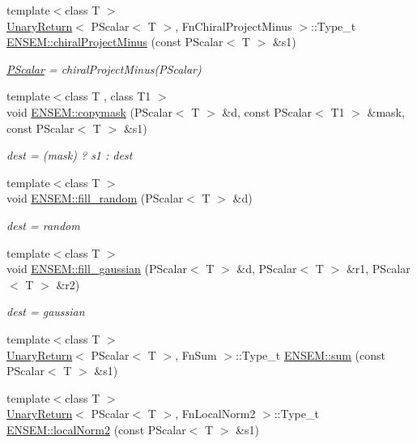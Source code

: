 \begin{DoxyCompactItemize}
{\footnotesize template$<$class T $>$ }\\\mbox{\hyperlink{structUnaryReturn}{Unary\+Return}}$<$ P\+Scalar$<$ T $>$, Fn\+Chiral\+Project\+Minus $>$\+::Type\+\_\+t \mbox{\hyperlink{group__primscalar_ga145e49e169b22a3ded82ba8af1b15da2}{E\+N\+S\+E\+M\+::chiral\+Project\+Minus}} (const P\+Scalar$<$ T $>$ \&s1)
\begin{DoxyCompactList}\small\item\em \mbox{\hyperlink{classENSEM_1_1PScalar}{P\+Scalar}} = chiral\+Project\+Minus(\+P\+Scalar) \end{DoxyCompactList}\item 
{\footnotesize template$<$class T , class T1 $>$ }\\void \mbox{\hyperlink{group__primscalar_gae14d6fea866a875601cb8d100fc8b3c2}{E\+N\+S\+E\+M\+::copymask}} (P\+Scalar$<$ T $>$ \&d, const P\+Scalar$<$ T1 $>$ \&mask, const P\+Scalar$<$ T $>$ \&s1)
\begin{DoxyCompactList}\small\item\em dest = (mask) ? s1 \+: dest \end{DoxyCompactList}\item 
{\footnotesize template$<$class T $>$ }\\void \mbox{\hyperlink{group__primscalar_ga7524cfb0562281bfab7fb3eca1daba0d}{E\+N\+S\+E\+M\+::fill\+\_\+random}} (P\+Scalar$<$ T $>$ \&d)
\begin{DoxyCompactList}\small\item\em dest = random \end{DoxyCompactList}\item 
{\footnotesize template$<$class T $>$ }\\void \mbox{\hyperlink{group__primscalar_gaec5e0050ee9c339ede0d4b1a839cea7b}{E\+N\+S\+E\+M\+::fill\+\_\+gaussian}} (P\+Scalar$<$ T $>$ \&d, P\+Scalar$<$ T $>$ \&r1, P\+Scalar$<$ T $>$ \&r2)
\begin{DoxyCompactList}\small\item\em dest = gaussian \end{DoxyCompactList}\item 
{\footnotesize template$<$class T $>$ }\\\mbox{\hyperlink{structUnaryReturn}{Unary\+Return}}$<$ P\+Scalar$<$ T $>$, Fn\+Sum $>$\+::Type\+\_\+t \mbox{\hyperlink{group__primscalar_gaa2733f98f3fc41be9ea11939aa1ee01b}{E\+N\+S\+E\+M\+::sum}} (const P\+Scalar$<$ T $>$ \&s1)
\item 
{\footnotesize template$<$class T $>$ }\\\mbox{\hyperlink{structUnaryReturn}{Unary\+Return}}$<$ P\+Scalar$<$ T $>$, Fn\+Local\+Norm2 $>$\+::Type\+\_\+t \mbox{\hyperlink{group__primscalar_ga21e7b79db399d760e036194c689a5291}{E\+N\+S\+E\+M\+::local\+Norm2}} (const P\+Scalar$<$ T $>$ \&s1)

\end{DoxyCompactItemize}
